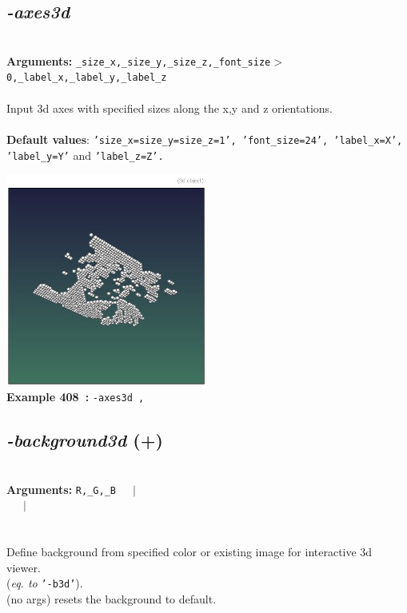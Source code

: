 \documentclass[a4paper,11pt,twoside]{book}
\begin{document}
\subsection{\emph{-axes3d} }\vspace*{-0.5em}
~\\\textbf{Arguments: } 
{\small \texttt{\_size\_x,\_size\_y,\_size\_z,\_font\_size$>$0,\_label\_x,\_label\_y,\_label\_z}}\\~\\
Input 3d axes with specified sizes along the x,y and z orientations.
~\\~\\\textbf{Default values}: {\small \texttt{'size\_x=size\_y=size\_z=1', 'font\_size=24', 'label\_x=X', 'label\_y=Y'} and \texttt{'label\_z=Z'.}}
\begin{center}\includegraphics[keepaspectratio=true,height=7cm,width=\textwidth]{img/gmic_def408.jpg}\\
{\footnotesize \textbf{Example 408~:} \texttt{-axes3d ,}}
\end{center}

\subsection{\emph{-background3d} (+)}\vspace*{-0.5em}
~\\\textbf{Arguments: } 
{\small \texttt{R,\_G,\_B}}~~~$|$\\
\hspace*{2.2cm}{\small \texttt{[image]}}~~~$|$\\
\\~\\
Define background from specified color or existing image for interactive 3d viewer.
~\\(\emph{eq. to} {\small \texttt{'-b3d'}}).
~\\(no args) resets the background to default.
\end{document}
